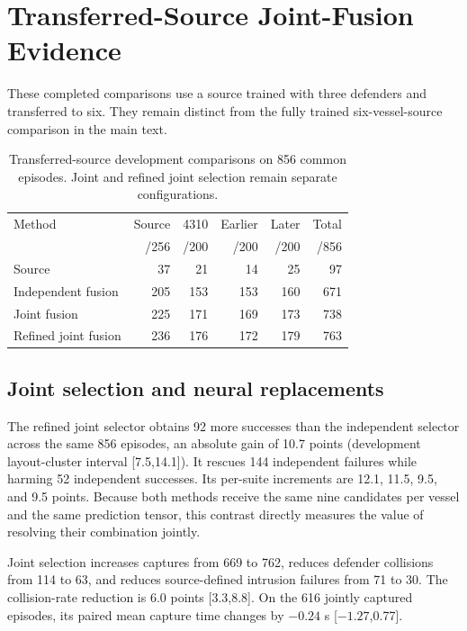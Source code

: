 \documentclass[journal]{IEEEtran}
\begin{document}
\appendices
\section{Transferred-Source Joint-Fusion Evidence}
\label{app:transferred-source}
These completed comparisons use a source trained with three defenders and transferred to six. They remain distinct from the fully trained six-vessel-source comparison in the main text.

\begin{table}[t]
\caption{Transferred-source development comparisons on 856 common episodes. Joint and refined joint selection remain separate configurations.}
\label{tab:transferred-development}\centering\scriptsize
\begin{tabular}{@{}lrrrrr@{}}\toprule
Method & Source & 4310 & Earlier & Later & Total\\
 & /256 & /200 & /200 & /200 & /856\\\midrule
Source & 37 & 21 & 14 & 25 & 97\\
Independent fusion & 205 & 153 & 153 & 160 & 671\\
Joint fusion & 225 & 171 & 169 & 173 & 738\\
Refined joint fusion & 236 & 176 & 172 & 179 & 763\\\bottomrule
\end{tabular}
\end{table}

\subsection{Joint selection and neural replacements}
The refined joint selector obtains 92 more successes than the independent selector across the same 856 episodes, an absolute gain of 10.7 points (development layout-cluster interval [7.5,14.1]). It rescues 144 independent failures while harming 52 independent successes. Its per-suite increments are 12.1, 11.5, 9.5, and 9.5 points. Because both methods receive the same nine candidates per vessel and the same prediction tensor, this contrast directly measures the value of resolving their combination jointly.

Joint selection increases captures from 669 to 762, reduces defender collisions from 114 to 63, and reduces source-defined intrusion failures from 71 to 30. The collision-rate reduction is 6.0 points [3.3,8.8]. On the 616 jointly captured episodes, its paired mean capture time changes by $-0.24$ s [$-1.27$,0.77].
\end{document}
